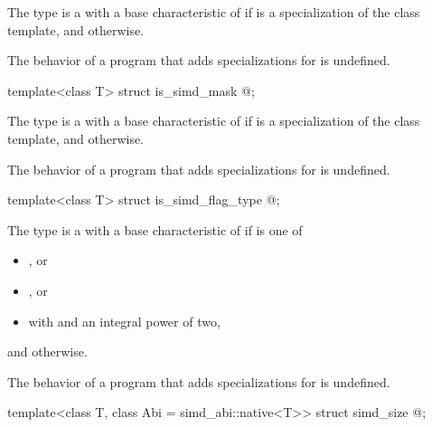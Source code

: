 \begin{itemdescr}
\pnum
The type  is a  with a base characteristic of  if  is a specialization of the  class template, and  otherwise.

\pnum
The behavior of a program that adds specializations for  is undefined.
\end{itemdescr}

\begin{itemdecl}
template<class T> struct is_simd_mask { @\seebelow@ };
\end{itemdecl}

\begin{itemdescr}
\pnum
The type  is a  with a base characteristic of  if  is a specialization of the  class template, and  otherwise.

\pnum
The behavior of a program that adds specializations for  is undefined.
\end{itemdescr}

\begin{itemdecl}
template<class T> struct is_simd_flag_type { @\seebelow@ };
\end{itemdecl}

\begin{itemdescr}
\pnum
The type  is a  with a base characteristic of  if  is one of
\begin{itemize}
  \item {}, or
  \item {}, or
  \item {} with  and  an integral power of two,
\end{itemize}
and  otherwise.

\pnum
The behavior of a program that adds specializations for  is undefined.
\end{itemdescr}

\begin{itemdecl}
template<class T, class Abi = simd_abi::native<T>> struct simd_size { @\seebelow@ };
\end{itemdecl}

